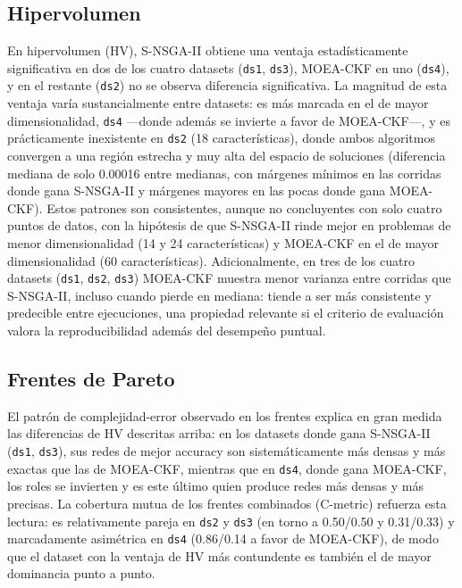 \subsection{Hipervolumen}

En hipervolumen (HV), S-NSGA-II obtiene una ventaja estadísticamente significativa en dos de los cuatro datasets (\texttt{ds1}, \texttt{ds3}), MOEA-CKF en uno (\texttt{ds4}), y en el restante (\texttt{ds2}) no se observa diferencia significativa. La magnitud de esta ventaja varía sustancialmente entre datasets: es más marcada en el de mayor dimensionalidad, \texttt{ds4} —donde además se invierte a favor de MOEA-CKF—, y es prácticamente inexistente en \texttt{ds2} (18 características), donde ambos algoritmos convergen a una región estrecha y muy alta del espacio de soluciones (diferencia mediana de solo 0.00016 entre medianas, con márgenes mínimos en las corridas donde gana S-NSGA-II y márgenes mayores en las pocas donde gana MOEA-CKF). Estos patrones son consistentes, aunque no concluyentes con solo cuatro puntos de datos, con la hipótesis de que S-NSGA-II rinde mejor en problemas de menor dimensionalidad (14 y 24 características) y MOEA-CKF en el de mayor dimensionalidad (60 características). Adicionalmente, en tres de los cuatro datasets (\texttt{ds1}, \texttt{ds2}, \texttt{ds3}) MOEA-CKF muestra menor varianza entre corridas que S-NSGA-II, incluso cuando pierde en mediana: tiende a ser más consistente y predecible entre ejecuciones, una propiedad relevante si el criterio de evaluación valora la reproducibilidad además del desempeño puntual.

\subsection{Frentes de Pareto}

El patrón de complejidad-error observado en los frentes explica en gran medida las diferencias de HV descritas arriba: en los datasets donde gana S-NSGA-II (\texttt{ds1}, \texttt{ds3}), sus redes de mejor accuracy son sistemáticamente más densas y más exactas que las de MOEA-CKF, mientras que en \texttt{ds4}, donde gana MOEA-CKF, los roles se invierten y es este último quien produce redes más densas y más precisas. La cobertura mutua de los frentes combinados (C-metric) refuerza esta lectura: es relativamente pareja en \texttt{ds2} y \texttt{ds3} (en torno a 0.50/0.50 y 0.31/0.33) y marcadamente asimétrica en \texttt{ds4} (0.86/0.14 a favor de MOEA-CKF), de modo que el dataset con la ventaja de HV más contundente es también el de mayor dominancia punto a punto.

